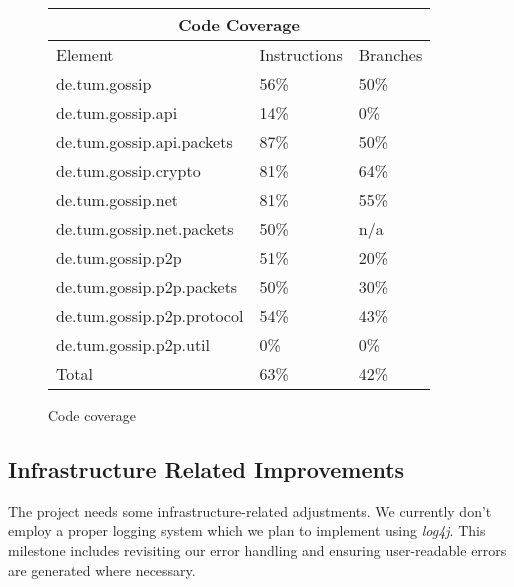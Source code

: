 \begin{figure}[htbp]
    \centering
    \begin{tabular}{ |p{5cm}||p{2cm}|p{2cm}| }
        \hline
        \multicolumn{3}{|c|}{Code Coverage} \\
        \hline
        Element & Instructions & Branches \\
        \hline
        de.tum.gossip & 56\% & 50\% \\
        de.tum.gossip.api & 14\% & 0\% \\
        de.tum.gossip.api.packets & 87\% & 50\% \\
        de.tum.gossip.crypto & 81\% & 64\% \\
        de.tum.gossip.net & 81\% & 55\% \\
        de.tum.gossip.net.packets & 50\% & n/a \\
        de.tum.gossip.p2p & 51\% & 20\% \\
        de.tum.gossip.p2p.packets & 50\% & 30\% \\
        de.tum.gossip.p2p.protocol & 54\% & 43\% \\
        de.tum.gossip.p2p.util & 0\% & 0\% \\
        Total & 63\% & 42\% \\
        \hline
    \end{tabular}
    \caption{Code coverage}
    \label{fig:code-coverage}
\end{figure}

\subsection{Infrastructure Related Improvements}\label{subsec:infrastructure-related}

The project needs some infrastructure-related adjustments.
We currently don't employ a proper logging system which we plan to implement using \textit{log4j}.
This milestone includes revisiting our error handling and ensuring user-readable errors
are generated where necessary.

